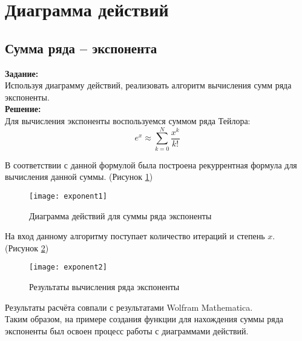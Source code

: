 \section*{Диаграмма действий}
\subsection*{Сумма ряда -- экспонента}

\textbf{Задание:}\\
Используя диаграмму действий, реализовать алгоритм вычисления сумм ряда экспоненты.\\

\textbf{Решение:}\\
Для вычисления экспоненты воспользуемся суммом ряда Тейлора:
\[e^x \approx \sum_{k = 0}^{N} \dfrac{x^k}{k!} \]

В соответствии с данной формулой была построена рекуррентная формула для вычисления данной суммы. (Рисунок \ref{fig:exponent1})
\begin{figure}[h]
	\centering \texttt{[image: exponent1]}
	\caption{Диаграмма действий для суммы ряда экспоненты}
	\label{fig:exponent1}
\end{figure}

На вход данному алгоритму поступает количество итераций и степень $x$. (Рисунок \ref{fig:exponent2})
\begin{figure}[h]
	\centering \texttt{[image: exponent2]}
	\caption{Результаты вычисления ряда экспоненты}
	\label{fig:exponent2}
\end{figure}

\newpage

Результаты расчёта совпали с результатами Wolfram Mathematica.\\

Таким образом, на примере создания функции для нахождения суммы ряда экспоненты был освоен процесс работы с диаграммами действий.